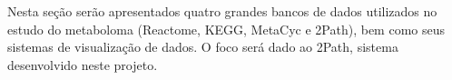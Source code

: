 \indent Nesta seção serão apresentados quatro grandes bancos de dados utilizados no estudo do metaboloma (Reactome, KEGG, MetaCyc e 2Path), bem como seus sistemas de visualização de dados. O foco será dado ao 2Path, sistema desenvolvido neste projeto. 
%
%




